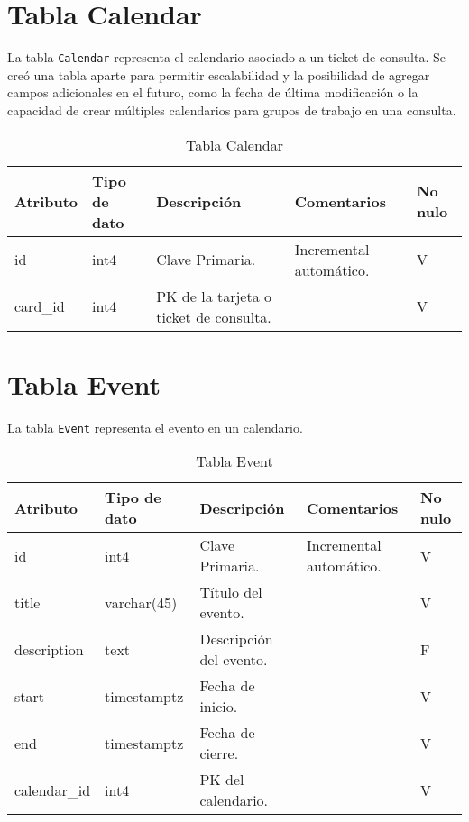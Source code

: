 \section{Tabla Calendar}\label{sec:table-calendar}
La tabla \texttt{Calendar} representa el calendario asociado a un ticket de consulta. Se creó una tabla aparte para permitir escalabilidad y la posibilidad de agregar campos adicionales en el futuro, como la fecha de última modificación o la capacidad de crear múltiples calendarios para grupos de trabajo en una consulta.

\begin{table}[htbp]
\centering
\label{tab:calendar}

\begin{tabular}{|p{3cm}|p{2.5cm}|p{4.5cm}|p{4cm}|p{1cm}|}
\hline
\textbf{Atributo} & \textbf{Tipo de dato}  & \textbf{Descripción} & \textbf{Comentarios} & \textbf{No nulo} \\ \hline
id & int4 & Clave Primaria. & Incremental automático. & V \\ \hline
card\_id & int4 & PK de la tarjeta o ticket de consulta. &  & V \\ \hline
\end{tabular}
\caption{Tabla Calendar}
\end{table}



\section{Tabla Event}\label{sec:table-calendar}
La tabla \texttt{Event} representa el evento en un calendario.

\begin{table}[htbp]
\centering
\label{tab:event}

\begin{tabular}{|p{3cm}|p{2.5cm}|p{4.5cm}|p{4cm}|p{1cm}|}
\hline
\textbf{Atributo} & \textbf{Tipo de dato}  & \textbf{Descripción} & \textbf{Comentarios} & \textbf{No nulo} \\ \hline
id & int4 & Clave Primaria. & Incremental automático. & V \\ \hline
title & varchar(45) & Título del evento. &  & V \\ \hline
description & text & Descripción del evento. &  & F \\ \hline
start & timestamptz & Fecha de inicio. &  & V \\ \hline
end & timestamptz & Fecha de cierre. &  & V \\ \hline
calendar\_id & int4 & PK del calendario. &  & V \\ \hline
\end{tabular}
\caption{Tabla Event}
\end{table}


